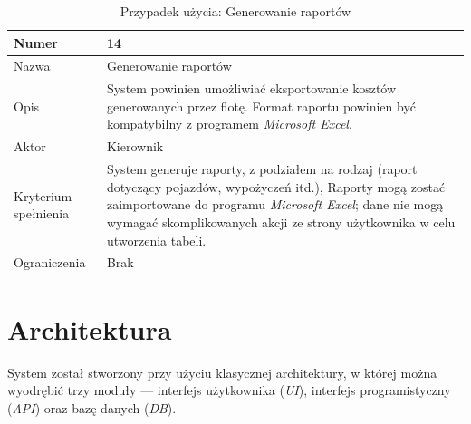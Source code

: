 \documentclass[eng,printmode,openany]{mgr}
\begin{document}
	\begin{table}[H]
		\caption{Przypadek użycia: Generowanie raportów}
		\begin{tabularx}{\textwidth}{|l|X|}
			\hline
			Numer                & 14  \\ \hline
			Nazwa                & Generowanie raportów \\ \hline
			Opis                 & System powinien umożliwiać eksportowanie kosztów generowanych przez flotę. Format raportu powinien być kompatybilny z programem \textit{Microsoft Excel}. \\ \hline
			Aktor                & Kierownik \\ \hline
			Kryterium spełnienia & System generuje raporty, z podziałem na rodzaj (raport dotyczący pojazdów, wypożyczeń itd.), Raporty mogą zostać zaimportowane do programu \textit{Microsoft Excel}; dane nie mogą wymagać skomplikowanych akcji ze strony użytkownika w celu utworzenia tabeli.\\ \hline
			Ograniczenia         & Brak  \\ \hline
		\end{tabularx}
	\end{table}
	
	\section{Architektura}
	System został stworzony przy użyciu klasycznej architektury, w której można wyodrębić trzy moduły — interfejs użytkownika (\textit{UI}), interfejs programistyczny (\textit{API}) oraz bazę danych (\textit{DB}).
	
\end{document}
